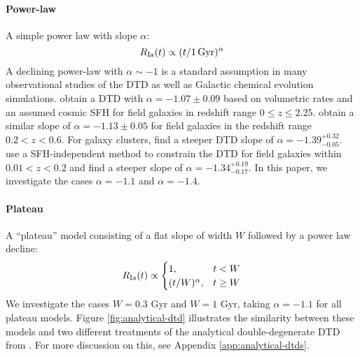 \documentclass[modern,linenumbers]{aastex631}
\begin{document}

\paragraph{Power-law} A simple power law with slope $\alpha$:
\begin{equation}
    R_{\rm Ia}(t) \propto (t/1\,\rm{Gyr})^\alpha
    \label{eq:powerlaw-dtd}
\end{equation}
A declining power-law with $\alpha\sim-1$ is a standard assumption in many observational studies of the DTD as well as Galactic chemical evolution simulations. \citet{Maoz2017-CosmicDTD} obtain a DTD with $\alpha=-1.07\pm0.09$ based on volumetric rates and an assumed cosmic SFH for field galaxies in redshift range $0\leq z\leq 2.25$. \citet{Wiseman2021-DESRates} obtain a similar slope of $\alpha=-1.13\pm0.05$ for field galaxies in the redshift range $0.2<z<0.6$. For galaxy clusters, \citet{Maoz2017-CosmicDTD} find a steeper DTD slope of $\alpha=-1.39^{+0.32}_{-0.05}$. \citet{Heringer2019-FieldGalaxyDTD} use a SFH-independent method to constrain the DTD for field galaxies within $0.01<z<0.2$ and find a steeper slope of $\alpha=-1.34^{+0.19}_{-0.17}$.
In this paper, we investigate the cases $\alpha=-1.1$ and $\alpha=-1.4$.

\paragraph{Plateau} A ``plateau'' model consisting of a flat slope of width $W$ followed by a power law decline:
\begin{equation}
    R_{\rm Ia}(t) \propto
    \begin{cases}
        1, & t < W \\
        (t/W)^\alpha, & t \ge W
    \end{cases}
    \label{eq:plateau-dtd}
\end{equation}
We investigate the cases $W=0.3$ Gyr and $W=1$ Gyr, taking $\alpha=-1.1$ for all plateau models. Figure \ref{fig:analytical-dtd} illustrates the similarity between these models and two different treatments of the analytical double-degenerate DTD from \citet{Greggio2005-AnalyticalRates}. For more discussion on this, see Appendix \ref{app:analytical-dtds}.
\end{document}
